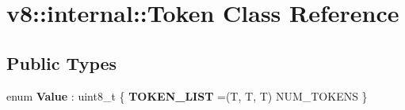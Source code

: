 \hypertarget{classv8_1_1internal_1_1Token}{}\section{v8\+:\+:internal\+:\+:Token Class Reference}
\label{classv8_1_1internal_1_1Token}
\subsection*{Public Types}
\begin{DoxyCompactItemize}
\item 
\mbox{\label{classv8_1_1internal_1_1Token_a89b12809241952e0af6ed185dc815756}} 
enum {\bfseries Value} \+: uint8\+\_\+t \{ {\bfseries T\+O\+K\+E\+N\+\_\+\+L\+I\+ST} =(T, T, T) N\+U\+M\+\_\+\+T\+O\+K\+E\+NS
 \}
\end{DoxyCompactItemize}
